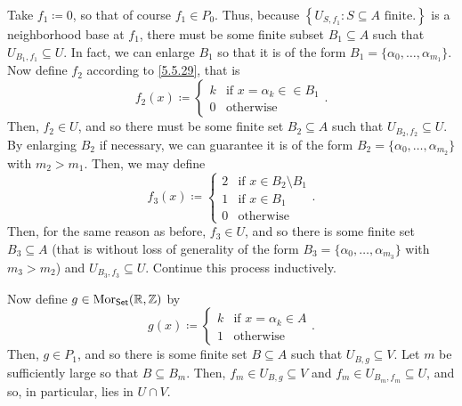 \begin{exm}
\begin{savenotes}
Take $f_1\coloneqq 0$, so that of course $f_1\in P_0$.  Thus, because $\left\{ U_{S,f_1}:S\subseteq A\text{ finite.}\right\}$ is a neighborhood base at $f_1$, there must be some finite subset $B_1\subseteq A$ such that $U_{B_1,f_1}\subseteq U$.  In fact, we can enlarge $B_1$ so that it is of the form $B_1=\{ \alpha _0,\ldots ,\alpha _{m_1}\}$.  Now define $f_2$ according to \eqref{5.5.29}, that is
\begin{equation}
f_2(x)\coloneqq \begin{cases}k & \text{if }x=\alpha _k\in \in B_1 \\ 0 & \text{otherwise}\end{cases}.
\end{equation}
Then, $f_2\in U$, and so there must be some finite set $B_2\subseteq A$ such that $U_{B_2,f_2}\subseteq U$.  By enlarging $B_2$ if necessary, we can guarantee it is of the form $B_2=\{ \alpha _0,\ldots ,\alpha _{m_2}\}$ with $m_2>m_1$.  Then, we may define
\begin{equation}
f_3(x)\coloneqq \begin{cases}2 & \text{if }x\in B_2\setminus B_1 \\ 1 & \text{if }x\in B_1 \\ 0 & \text{otherwise}\end{cases}.
\end{equation}
Then, for the same reason as before, $f_3\in U$, and so there is some finite set $B_3\subseteq A$ (that is without loss of generality of the form $B_3=\{ \alpha _0,\ldots ,\alpha _{m_3}\}$ with $m_3>m_2$) and $U_{B_3,f_3}\subseteq U$.  Continue this process inductively.

Now define $g\in \operatorname{Mor} _{\mathsf{Set}}(\mathbb{R} ,\mathbb{Z} )$ by
\begin{equation}
g(x)\coloneqq \begin{cases}k & \text{if }x=\alpha _k\in A \\ 1 & \text{otherwise}\end{cases}.
\end{equation}
Then, $g\in P_1$, and so there is some finite set $B\subseteq A$ such that $U_{B,g}\subseteq V$.  Let $m$ be sufficiently large so that $B\subseteq B_m$.  Then, $f_m\in U_{B,g}\subseteq V$ and $f_m\in U_{B_m,f_m}\subseteq U$, and so, in particular, lies in $U\cap V$.


\end{savenotes}
\end{exm}
